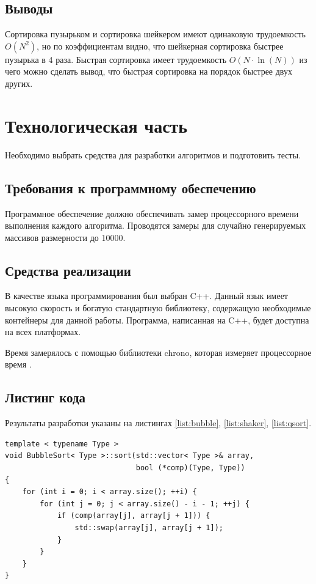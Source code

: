 \documentclass[a4paper,12pt]{article}
\begin{document}
\subsection{Выводы}

Сортировка пузырьком и сортировка шейкером имеют одинаковую трудоемкость $O(N^2)$, но
по коэффициентам видно, что шейкерная сортировка быстрее пузырька в 4 раза. Быстрая
сортировка имеет трудоемкость $O(N \cdot \ln(N))$ из чего можно сделать вывод, что
быстрая сортировка на порядок быстрее двух других.

\newpage
\section{Технологическая часть}

Необходимо выбрать средства для разработки алгоритмов и подготовить тесты.

\subsection{Требования к программному обеспечению}

Программное обеспечение должно обеспечивать замер процессорного времени выполнения каждого
алгоритма. Проводятся замеры для случайно генерируемых массивов размерности до 10000.

\subsection{Средства реализации}

В качестве языка программирования был выбран C++. Данный язык имеет высокую скорость и
богатую стандартную библиотеку, содержащую необходимые контейнеры для данной работы.
Программа, написанная на C++, будет доступна на всех платформах.

Время замерялось с помощью библиотеки chrono, которая измеряет процессорное
время \cite{chrono}.

\subsection{Листинг кода}

Результаты разработки указаны на листингах \ref{list:bubble}, \ref{list:shaker},
\ref{list:qsort}.

\begin{lstlisting}[caption=Сортировка пузырьком,label=list:bubble]
template < typename Type >
void BubbleSort< Type >::sort(std::vector< Type >& array,
                              bool (*comp)(Type, Type))
{
    for (int i = 0; i < array.size(); ++i) {
        for (int j = 0; j < array.size() - i - 1; ++j) {
            if (comp(array[j], array[j + 1])) {
                std::swap(array[j], array[j + 1]);
            }
        }
    }
}
\end{lstlisting}
\end{document}
